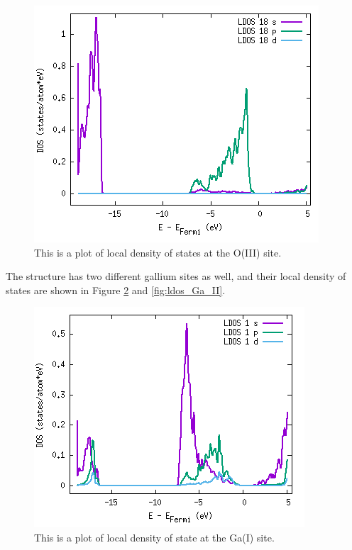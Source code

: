 \begin{figure}[H]
\includegraphics[width=\linewidth]{../fig/dosplot/ldos_O_III}\caption{This is a plot of local density of states at the O(III) site.}\label{fig:ldos_O_III}
\end{figure}

The structure has two different gallium sites as well, and their local density of states are shown in Figure \ref{fig:ldos_Ga_I} and \ref{fig:ldos_Ga_II}.

\begin{figure}[H]
\includegraphics[width=\linewidth]{../fig/dosplot/ldos_Ga_I}\caption{This is a plot of local density of state at the Ga(I) site.}\label{fig:ldos_Ga_I}
\end{figure}

